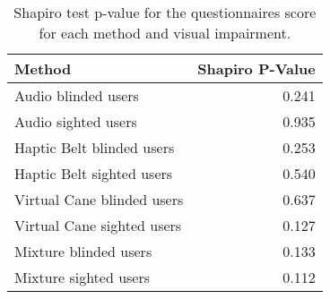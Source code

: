 
\begin{table}[!htb]
\centering
\caption{Shapiro test p-value for the questionnaires score for each method and visual impairment.}
\label{tab:shapiro_questionnaires}
\begin{tabular}{lr}
\toprule
                    Method &  Shapiro P-Value \\
\midrule
       Audio blinded users &            0.241 \\
       Audio sighted users &            0.935 \\
 Haptic Belt blinded users &            0.253 \\
 Haptic Belt sighted users &            0.540 \\
Virtual Cane blinded users &            0.637 \\
Virtual Cane sighted users &            0.127 \\
     Mixture blinded users &            0.133 \\
     Mixture sighted users &            0.112 \\
\bottomrule
\end{tabular}
\end{table}

